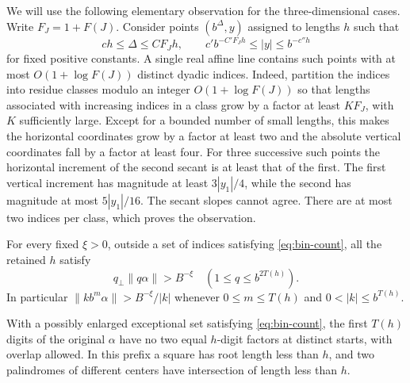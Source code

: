 We will use the following elementary observation for the
three-dimensional cases. Write \(F_J=1+F(J)\). Consider points
\((b^\Delta,y)\) assigned to lengths \(h\) such that
\begin{equation}\label{eq:secant-hyp}
 c h\le\Delta\le C F_J h,\qquad
 c' b^{-C' F_J h}\le |y|\le b^{-c''h}
\end{equation}
for fixed positive constants. A single real affine line contains
such points with at most \(O(1+\log F(J))\) distinct dyadic indices.
Indeed, partition the indices into residue classes modulo
an integer \(O(1+\log F(J))\) so that lengths associated with
increasing indices in a class grow by a factor at least \(K F_J\),
with \(K\) sufficiently large. Except for a bounded number of small
lengths, this makes the horizontal coordinates grow by a factor
at least two and the absolute vertical coordinates fall by a factor
at least four. For three successive such points the horizontal
increment of the second secant is at least that of the first.
The first vertical increment has magnitude at least
\(3|y_1|/4\), while the second has magnitude at most \(5|y_1|/16\).
The secant slopes cannot agree. There are at most two indices
per class, which proves the observation.

\begin{theorem}\label{thm:late-separation}
For every fixed \(\xi>0\), outside a set of indices satisfying
\eqref{eq:bin-count}, all the retained \(h\) satisfy
\begin{equation}\label{eq:uniform-q}
       q_\perp\|q\alpha\|>B^{-\xi}
         \quad(1\le q\le b^{2T(h)}).
\end{equation}
In particular
\(\|k b^m\alpha\|>B^{-\xi}/|k|\) whenever
\(0\le m\le T(h)\) and \(0<|k|\le b^{T(h)}\).

With a possibly enlarged exceptional set satisfying
\eqref{eq:bin-count}, the first \(T(h)\) digits of the original
\(\alpha\) have no two equal \(h\)-digit factors at distinct starts,
with overlap allowed. In this prefix a square has root length less
than \(h\), and two palindromes of different centers have
intersection of length less than \(h\).
\end{theorem}

